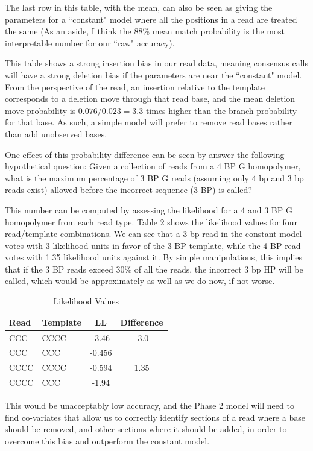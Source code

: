 \documentclass[DIV=calc, paper=a4, fontsize=11pt, twocolumn]{scrartcl}	 %
\begin{document}
The last row in this table, with the mean, can also be seen as giving the parameters for a ``constant" model where all the positions in a read are treated the same (As an aside, I think the 88\% mean match probability is the most interpretable number for our ``raw" accuracy).

This table shows a strong insertion bias in our read data, meaning consensus calls will have a strong deletion bias if the parameters are near the  ``constant" model.  From the perspective of the read, an insertion relative to the template corresponds to a deletion move through that read base, and the mean deletion move probability is $0.076 / 0.023 = 3.3$ times higher than the branch probability for that base.  As such, a simple model will prefer to remove read bases rather than add unobserved bases.

One effect of this probability difference can be seen by answer the following hypothetical question: Given a collection of reads from a 4 BP G homopolymer, what is the maximum percentage of 3 BP G reads (assuming only 4 bp and 3 bp reads exist) allowed before the incorrect sequence (3 BP) is called?

This number can be computed by assessing the likelihood for a 4 and 3 BP G homopolymer from each read type.  Table 2 shows the likelihood values for four read/template combinations.  We can see that a 3 bp read in the constant model votes with 3 likelihood units in favor of the 3 BP template, while the 4 BP read votes with 1.35 likelihood units against it.  By simple manipulations, this implies that if the 3 BP reads exceed 30\% of all the reads, the incorrect 3 bp HP will be called, which would be approximately as well as we do now, if not worse.

\begin{table}[ht]
\caption{Likelihood Values}
\centering
\begin{tabular}{ | l | l | c | c | }
\hline

Read & Template & LL & Difference \\ \hline
CCC & CCCC & -3.46 & -3.0 \\
CCC & CCC & -0.456 &   \\ \hline
CCCC & CCCC & -0.594 &1.35 \\
CCCC & CCC & -1.94 &   \\
\bottomrule
\end{tabular}
\end{table}

This would be unacceptably low accuracy, and the Phase 2 model will need to find co-variates that allow us to correctly identify sections of a read where a base should be removed, and other sections where it should be added, in order to overcome this bias and outperform the constant model.
\end{document}
